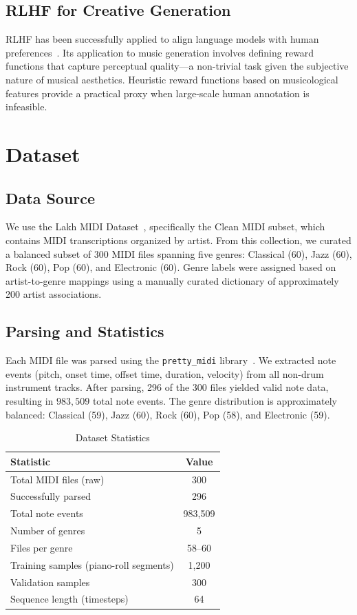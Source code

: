 \documentclass[conference]{IEEEtran}
\begin{document}
\subsection{RLHF for Creative Generation}
RLHF has been successfully applied to align language models with human preferences~\cite{ouyang2022training}. Its application to music generation involves defining reward functions that capture perceptual quality---a non-trivial task given the subjective nature of musical aesthetics. Heuristic reward functions based on musicological features provide a practical proxy when large-scale human annotation is infeasible.

\section{Dataset}

\subsection{Data Source}
We use the Lakh MIDI Dataset~\cite{raffel2016learning}, specifically the Clean MIDI subset, which contains MIDI transcriptions organized by artist. From this collection, we curated a balanced subset of 300 MIDI files spanning five genres: Classical (60), Jazz (60), Rock (60), Pop (60), and Electronic (60). Genre labels were assigned based on artist-to-genre mappings using a manually curated dictionary of approximately 200 artist associations.

\subsection{Parsing and Statistics}
Each MIDI file was parsed using the \texttt{pretty\_midi} library~\cite{raffel2014intuitive}. We extracted note events (pitch, onset time, offset time, duration, velocity) from all non-drum instrument tracks. After parsing, 296 of the 300 files yielded valid note data, resulting in $983{,}509$ total note events. The genre distribution is approximately balanced: Classical (59), Jazz (60), Rock (60), Pop (58), and Electronic (59).

\begin{table}[ht]
\centering
\caption{Dataset Statistics}
\label{tab:dataset}
\begin{tabular}{lc}
\toprule
\textbf{Statistic} & \textbf{Value} \\
\midrule
Total MIDI files (raw) & 300 \\
Successfully parsed & 296 \\
Total note events & 983,509 \\
Number of genres & 5 \\
Files per genre & 58--60 \\
Training samples (piano-roll segments) & 1,200 \\
Validation samples & 300 \\
Sequence length (timesteps) & 64 \\
\bottomrule
\end{tabular}
\end{table}
\end{document}
